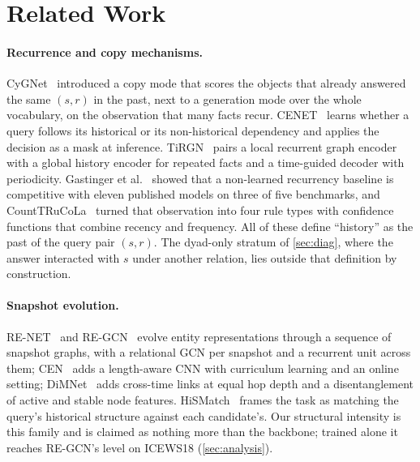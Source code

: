 \section{Related Work}
\label{sec:related}

\paragraph{Recurrence and copy mechanisms.}
CyGNet~\cite{zhu2021cygnet} introduced a copy mode that scores the objects that already answered the same $(s, r)$ in the past, next to a generation mode over the whole vocabulary, on the observation that many facts recur. CENET~\cite{xu2023cenet} learns whether a query follows its historical or its non-historical dependency and applies the decision as a mask at inference. TiRGN~\cite{li2022tirgn} pairs a local recurrent graph encoder with a global history encoder for repeated facts and a time-guided decoder with periodicity. Gastinger et al.~\cite{gastinger2024history} showed that a non-learned recurrency baseline is competitive with eleven published models on three of five benchmarks, and CountTRuCoLa~\cite{gastinger2026counttrucola} turned that observation into four rule types with confidence functions that combine recency and frequency. All of these define ``history'' as the past of the query pair $(s, r)$. The dyad-only stratum of \cref{sec:diag}, where the answer interacted with $s$ under another relation, lies outside that definition by construction.

\paragraph{Snapshot evolution.}
RE-NET~\cite{jin2020renet} and RE-GCN~\cite{li2021regcn} evolve entity representations through a sequence of snapshot graphs, with a relational GCN per snapshot and a recurrent unit across them; CEN~\cite{li2022cen} adds a length-aware CNN with curriculum learning and an online setting; DiMNet~\cite{dong2025dimnet} adds cross-time links at equal hop depth and a disentanglement of active and stable node features. HiSMatch~\cite{li2022hismatch} frames the task as matching the query's historical structure against each candidate's. Our structural intensity is this family and is claimed as nothing more than the backbone; trained alone it reaches RE-GCN's level on ICEWS18 (\cref{sec:analysis}).

